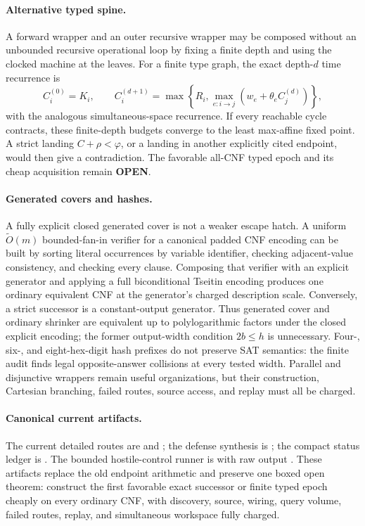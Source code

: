 \documentclass[11pt]{article}
\begin{document}
\paragraph{Alternative typed spine.}
A forward wrapper and an outer recursive wrapper may be composed without an
unbounded recursive operational loop by fixing a finite depth and using the
clocked machine at the leaves.  For a finite type graph, the exact depth-$d$
time recurrence is
\[
 C_i^{(0)}=K_i,
 \qquad
 C_i^{(d+1)}=
 \max\!\left\{R_i,\max_{e:i\to j}
       (w_e+\theta_e C_j^{(d)})\right\},
\]
with the analogous simultaneous-space recurrence.  If every reachable cycle
contracts, these finite-depth budgets converge to the least max-affine fixed
point.  A strict landing $C+\rho<\varphi$, or a landing in another explicitly
cited endpoint, would then give a contradiction.  The favorable all-CNF typed
epoch and its cheap acquisition remain \textbf{OPEN}.

\paragraph{Generated covers and hashes.}
A fully explicit closed generated cover is not a weaker escape hatch.  A
uniform $\widetilde O(m)$ bounded-fan-in verifier for a canonical padded CNF
encoding can be built by sorting literal occurrences by variable identifier,
checking adjacent-value consistency, and checking every clause.  Composing
that verifier with an explicit generator and applying a full biconditional
Tseitin encoding produces one ordinary equivalent CNF at the generator's
charged description scale.  Conversely, a strict successor is a
constant-output generator.  Thus generated cover and ordinary shrinker are
equivalent up to polylogarithmic factors under the closed explicit encoding;
the former output-width condition $2b\le h$ is unnecessary.  Four-, six-, and
eight-hex-digit hash prefixes do not preserve SAT semantics: the finite audit
finds legal opposite-answer collisions at every tested width.  Parallel and
disjunctive wrappers remain useful organizations, but their construction,
Cartesian branching, failed routes, source access, and replay must all be
charged.

\paragraph{Canonical current artifacts.}
The current detailed routes are  and ; the
defense synthesis is ; the compact status ledger is
.  The bounded hostile-control runner is
 with raw output
.  These artifacts replace the old
endpoint arithmetic and preserve one boxed open theorem: construct the first
favorable exact successor or finite typed epoch cheaply on every ordinary CNF,
with discovery, source, wiring, query volume, failed routes, replay, and
simultaneous workspace fully charged.
\end{document}
